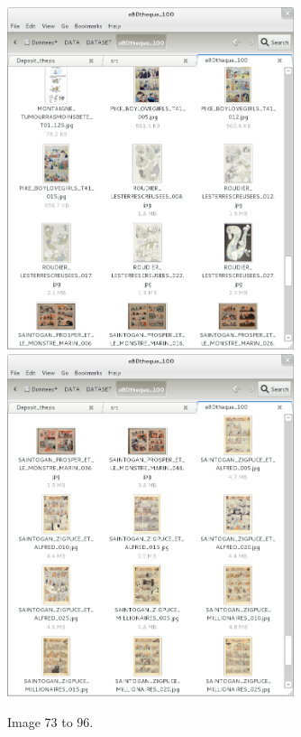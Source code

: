  \begin{figure}[h!]  %
    \centering
    
    \includegraphics[trim= 5px 10px 30px 152px, clip, width=0.75\textwidth]{thumb_08.png}
    \\
    \includegraphics[trim= 5px 10px 30px 152px, clip, width=0.75\textwidth]{thumb_09.png}
    \caption{Image 73 to 96.}
    \label{fig:app:7_8}
  \end{figure}


